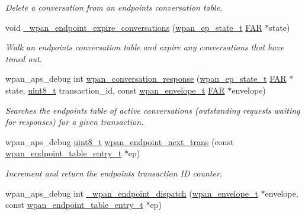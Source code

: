 \begin{DoxyCompactItemize}
\begin{DoxyCompactList}\small\item\em Delete a conversation from an endpoint\textquotesingle{}s conversation table. \end{DoxyCompactList}\item 
void \hyperlink{group__wpan__aps_gad55133545fcf6ebc2d630057abf5ad48}{\+\_\+wpan\+\_\+endpoint\+\_\+expire\+\_\+conversations} (\hyperlink{structwpan__ep__state__t}{wpan\+\_\+ep\+\_\+state\+\_\+t} \hyperlink{group__hal_gaef060b3456fdcc093a7210a762d5f2ed}{F\+AR} $\ast$state)
\begin{DoxyCompactList}\small\item\em Walk an endpoint\textquotesingle{}s conversation table and expire any conversations that have timed out. \end{DoxyCompactList}\item 
wpan\+\_\+aps\+\_\+debug int \hyperlink{group__wpan__aps_gaf56e4d0e52462b5cf41c5fa5f23ea952}{wpan\+\_\+conversation\+\_\+response} (\hyperlink{structwpan__ep__state__t}{wpan\+\_\+ep\+\_\+state\+\_\+t} \hyperlink{group__hal_gaef060b3456fdcc093a7210a762d5f2ed}{F\+AR} $\ast$state, \hyperlink{group__hal__dos_gae1affc9ca37cfb624959c866a73f83c2}{uint8\+\_\+t} transaction\+\_\+id, const \hyperlink{structwpan__envelope__t}{wpan\+\_\+envelope\+\_\+t} \hyperlink{group__hal_gaef060b3456fdcc093a7210a762d5f2ed}{F\+AR} $\ast$envelope)
\begin{DoxyCompactList}\small\item\em Searches the endpoint\textquotesingle{}s table of active conversations (outstanding requests waiting for responses) for a given transaction. \end{DoxyCompactList}\item 
wpan\+\_\+aps\+\_\+debug \hyperlink{group__hal__dos_gae1affc9ca37cfb624959c866a73f83c2}{uint8\+\_\+t} \hyperlink{group__wpan__aps_gaab1c77ccbd237270f11499fb6411599c}{wpan\+\_\+endpoint\+\_\+next\+\_\+trans} (const \hyperlink{structwpan__endpoint__table__entry__t}{wpan\+\_\+endpoint\+\_\+table\+\_\+entry\+\_\+t} $\ast$ep)
\begin{DoxyCompactList}\small\item\em Increment and return the endpoint\textquotesingle{}s transaction ID counter. \end{DoxyCompactList}\item 
wpan\+\_\+aps\+\_\+debug int \hyperlink{group__wpan__aps_gaea487a9cccf8d5a2c592324678f13b4b}{\+\_\+wpan\+\_\+endpoint\+\_\+dispatch} (\hyperlink{structwpan__envelope__t}{wpan\+\_\+envelope\+\_\+t} $\ast$envelope, const \hyperlink{structwpan__endpoint__table__entry__t}{wpan\+\_\+endpoint\+\_\+table\+\_\+entry\+\_\+t} $\ast$ep)

\end{DoxyCompactItemize}
